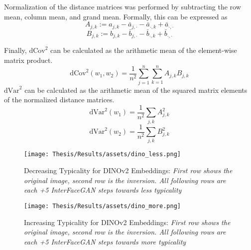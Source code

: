 Normalization of the distance matrices was performed by subtracting the row mean, column mean, and grand mean. Formally, this can be expressed as
\begin{equation}
A_{j,k} := a_{j,k} - \bar{a}_{j,\cdot} - \bar{a}_{\cdot,k} + \bar{a}_{\cdot,\cdot}
\end{equation}
\begin{equation}
B_{j,k} := b_{j,k} - \bar{b}_{j,\cdot} - \bar{b}_{\cdot,k} + \bar{b}_{\cdot,\cdot}
\end{equation}

Finally, $\text{dCov}^2$ can be calculated as the arithmetic mean of the element-wise matrix product.
\begin{equation}
\text{dCov}^2(w_1, w_2) = \frac{1}{n^2} \sum_{j=1}^{n} \sum_{k=1}^{n} A_{j,k} B_{j,k}
\end{equation}
$\text{dVar}^2$ can be calculated as the arithmetic mean of the squared matrix elements of the normalized distance matrices.
\begin{equation}
\text{dVar}^2(w_1) = \frac{1}{n^2} \sum_{j,k} A_{j,k}^2
\end{equation}
\begin{equation}\label{eq:last_dcor_formula}
\text{dVar}^2(w_2) = \frac{1}{n^2} \sum_{j,k} B_{j,k}^2
\end{equation}

\FloatBarrier


\clearpage
\begin{figure}[!ht]
    \centering
    \texttt{[image: Thesis/Results/assets/dino\_less.png]}
    \caption[Decreasing Typicality for DINOv2 Embeddings]{Decreasing Typicality for DINOv2 Embeddings: \textit{First row shows the original image, second row is the inversion. All following rows are each +5 InterFaceGAN steps towards less typicality}}
    \label{fig:dino_less}
\end{figure}

\clearpage
\begin{figure}[!ht]
    \centering
    \texttt{[image: Thesis/Results/assets/dino\_more.png]}
    \caption[Increasing Typicality for DINOv2 Embeddings]{Increasing Typicality for DINOv2 Embeddings: \textit{First row shows the original image, second row is the inversion. All following rows are each +5 InterFaceGAN steps towards more typicality}}
    \label{fig:dino_more}
\end{figure}


